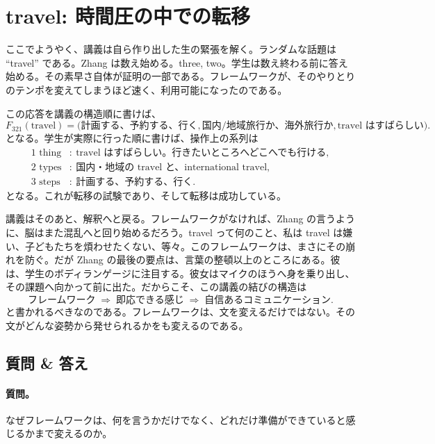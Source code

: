 \section{travel: 時間圧の中での転移}

ここでようやく、講義は自ら作り出した生の緊張を解く。ランダムな話題は ``travel'' である。Zhang は数え始める。three, two。学生は数え終わる前に答え始める。その素早さ自体が証明の一部である。フレームワークが、そのやりとりのテンポを変えてしまうほど速く、利用可能になったのである。

この応答を講義の構造順に書けば、
\begin{equation}
F_{321}(\text{travel})
=
\bigl(
\text{計画する、予約する、行く},
\text{国内/地域旅行か、海外旅行か},
\text{travel はすばらしい}
\bigr).
\end{equation}
となる。学生が実際に行った順に書けば、操作上の系列は
\begin{align}
\text{1 thing} &:\ \text{travel はすばらしい。行きたいところへどこへでも行ける},\\
\text{2 types} &:\ \text{国内・地域の travel と、international travel},\\
\text{3 steps} &:\ \text{計画する、予約する、行く}.
\end{align}
となる。これが転移の試験であり、そして転移は成功している。

講義はそのあと、解釈へと戻る。フレームワークがなければ、Zhang の言うように、脳はまた混乱へと回り始めるだろう。travel って何のこと、私は travel は嫌い、子どもたちを煩わせたくない、等々。このフレームワークは、まさにその崩れを防ぐ。だが Zhang の最後の要点は、言葉の整頓以上のところにある。彼は、学生のボディランゲージに注目する。彼女はマイクのほうへ身を乗り出し、その課題へ向かって前に出た。だからこそ、この講義の結びの構造は
\begin{equation}
\text{フレームワーク}
\;\Rightarrow\;
\text{即応できる感じ}
\;\Rightarrow\;
\text{自信あるコミュニケーション}.
\end{equation}
と書かれるべきなのである。フレームワークは、文を変えるだけではない。その文がどんな姿勢から発せられるかをも変えるのである。

\subsection{質問 \& 答え}

\paragraph{質問。} なぜフレームワークは、何を言うかだけでなく、どれだけ準備ができていると感じるかまで変えるのか。

